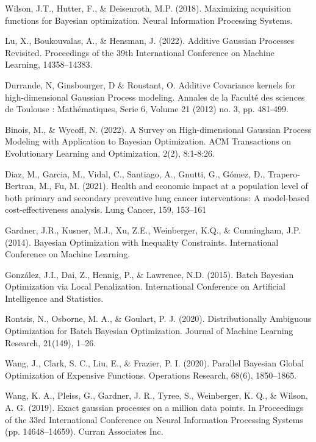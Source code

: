 \documentclass{IOS-Book-Article}
\begin{document}
\begin{thebibliography}{99}
		Wilson, J.T., Hutter, F., \& Deisenroth, M.P. (2018). Maximizing acquisition functions for Bayesian optimization. Neural Information Processing Systems.
		
		Lu, X., Boukouvalas, A., \& Hensman, J. (2022). Additive Gaussian Processes Revisited. Proceedings of the 39th International Conference on Machine Learning, 14358–14383.
		
		Durrande, N, Ginsbourger, D \& Roustant, O. Additive Covariance kernels for high-dimensional Gaussian Process modeling. Annales de la Faculté des sciences de Toulouse : Mathématiques, Serie 6, Volume 21 (2012) no. 3, pp. 481-499.
		
		Binois, M., \& Wycoff, N. (2022). A Survey on High-dimensional Gaussian Process Modeling with Application to Bayesian Optimization. ACM Transactions on Evolutionary Learning and Optimization, 2(2), 8:1-8:26.
		
		Diaz, M., Garcia, M., Vidal, C., Santiago, A., Gnutti, G., Gómez, D., Trapero-Bertran, M., Fu, M. (2021). Health and economic impact at a population level of both primary and secondary preventive lung cancer interventions: A model-based cost-effectiveness analysis. Lung Cancer, 159, 153–161
		
		Gardner, J.R., Kusner, M.J., Xu, Z.E., Weinberger, K.Q., \& Cunningham, J.P. (2014). Bayesian Optimization with Inequality Constraints. International Conference on Machine Learning.
		
		González, J.I., Dai, Z., Hennig, P., \& Lawrence, N.D. (2015). Batch Bayesian Optimization via Local Penalization. International Conference on Artificial Intelligence and Statistics.
		
		Rontsis, N., Osborne, M. A., \& Goulart, P. J. (2020). Distributionally Ambiguous Optimization for Batch Bayesian Optimization. Journal of Machine Learning Research, 21(149), 1–26.
		
		Wang, J., Clark, S. C., Liu, E., \& Frazier, P. I. (2020). Parallel Bayesian Global Optimization of Expensive Functions. Operations Research, 68(6), 1850–1865.
		
		Wang, K. A., Pleiss, G., Gardner, J. R., Tyree, S., Weinberger, K. Q., \& Wilson, A. G. (2019). Exact gaussian processes on a million data points. In Proceedings of the 33rd International Conference on Neural Information Processing Systems (pp. 14648–14659). Curran Associates Inc.
		
	\end{thebibliography}
	
\end{document}
